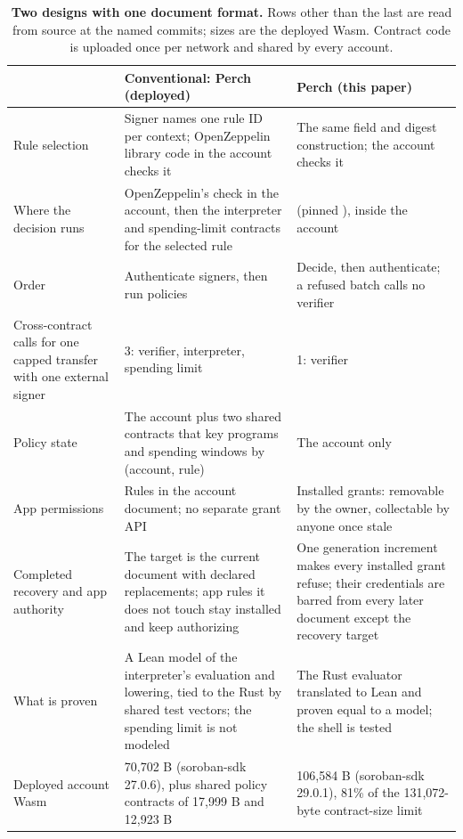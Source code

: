 \begin{table}[tbp]
\centering
\caption{\textbf{Two designs with one document format.} Rows other than the last are read from source at the named commits; sizes are the deployed Wasm. Contract code is uploaded once per network and shared by every account.}\label{tab:tab-6}
\footnotesize\begin{tabularx}{\linewidth}{@{}LLL@{}}
\toprule
\textbf{} & \textbf{Conventional: Perch  (deployed)} & \textbf{Perch  (this paper)} \\
\midrule
Rule selection & Signer names one rule ID per context; OpenZeppelin library code in the account checks it & The same field and digest construction; the account checks it \\
Where the decision runs & OpenZeppelin's check in the account, then the interpreter and spending-limit contracts for the selected rule &  (pinned ), inside the account \\
Order & Authenticate signers, then run policies & Decide, then authenticate; a refused batch calls no verifier \\
Cross-contract calls for one capped transfer with one external signer & 3: verifier, interpreter, spending limit & 1: verifier \\
Policy state & The account plus two shared contracts that key programs and spending windows by (account, rule) & The account only \\
App permissions & Rules in the account document; no separate grant API & Installed grants: removable by the owner, collectable by anyone once stale \\
Completed recovery and app authority & The target is the current document with declared replacements; app rules it does not touch stay installed and keep authorizing & One generation increment makes every installed grant refuse; their credentials are barred from every later document except the recovery target \\
What is proven & A Lean model of the interpreter's evaluation and lowering, tied to the Rust by shared test vectors; the spending limit is not modeled & The Rust evaluator translated to Lean and proven equal to a model; the shell is tested \\
Deployed account Wasm & 70,702 B (soroban-sdk 27.0.6), plus shared policy contracts of 17,999 B and 12,923 B & 106,584 B (soroban-sdk 29.0.1), 81\% of the 131,072-byte contract-size limit \\
\bottomrule
\end{tabularx}
\end{table}
